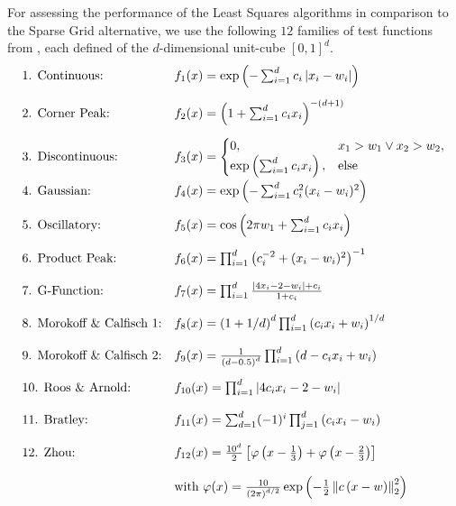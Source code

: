 \documentclass[12pt, oneside]{amsart}
\theoremstyle{definition}
\theoremstyle{remark}
\numberwithin{equation}{section}
\begin{document}

For assessing the performance of the Least Squares algorithms in comparison to 
the Sparse Grid alternative, we use the following $12$ families of test 
functions from \cite{Simulationlib_2013}, each defined of the $d$-dimensional 
unit-cube $[0,1]^d$.
{
	\allowdisplaybreaks[4]
	\begin{align*}
		\begin{array}{l l}
			\text{1. Continuous:} & f_1(x) = \exp\left( - 
			\sum_{i=1}^{d} c_i \abs{x_i - w_i} \right) \\[12pt]
			\text{2. Corner Peak:} & f_2(x) = \left( 1 + 
			\sum_{i=1}^{d} c_i x_i 
			\right)^{-(d+1)} \\[12pt]
			\text{3. Discontinuous:} & f_3(x) = 
			\begin{cases}
				0, &x_1 > w_1 \lor x_2 > w_2, \\
				\exp\left( \sum_{i=1}^{d} c_i x_i \right), & 
				\text{else}
			\end{cases} \\[12pt]
			\text{4. Gaussian:} & f_4(x) = \exp\left( - 
			\sum_{i=1}^{d} c_i^2 (x_i 
			- w_i)^2 \right) \\[12pt]
			\text{5. Oscillatory:} & f_5(x) = \cos\left( 2\pi w_1 + 
			\sum_{i=1}^{d} c_i x_i \right) \\[12pt]
			\text{6. Product Peak:} & f_6(x) = \prod_{i=1}^{d} 
			\left( c_i^{-2} + (x_i - w_i)^2 \right)^{-1} \\[12pt]
			\text{7. G-Function:} & f_7(x) = \prod_{i=1}^{d}
			\frac{\abs{4x_i-2-w_i}+c_i}{1+c_i}
			\\[12pt]
			\text{8. Morokoff \& Calfisch 1:} & f_8(x) = 
			\left(1+1/d\right)^d  
			\prod_{i=1}^{d}\left(c_ix_i+w_i\right)^{1/d}
			\\[12pt]
			\text{9. Morokoff \& Calfisch 2:} & f_9(x) = 
			\frac{1}{\left(d-0.5\right)^d} 
			\prod_{i=1}^{d}\left(d-c_ix_i+w_i\right)
			\\[12pt]
			\text{10. Roos \& Arnold:} & f_{10}(x) = \prod_{i=1}^{d} 
			\abs{4c_ix_i-2-w_i}
			\\[12pt]
			\text{11. Bratley:} & f_{11}(x) = 
			\sum_{d=1}^{d}(-1)^{i}\prod_{j=1}^{d} \left(c_ix_i-w_i\right)
			\\[12pt]
			\text{12. Zhou:} & f_{12}(x) = \frac{10^d}{2} 
			\left[\phi\left(x-\frac13\right)+\phi\left(x-\frac23\right)\right] 
			\\[12pt]
			& \text{with }\phi(x) = 
			\frac{10}{\left(2\pi\right)^{d/2}} 
			\exp \left(-\frac{1}{2}\norm[2]{c\left(x-w\right)}^2\right)
		\end{array}
	\end{align*}
}
\end{document}
